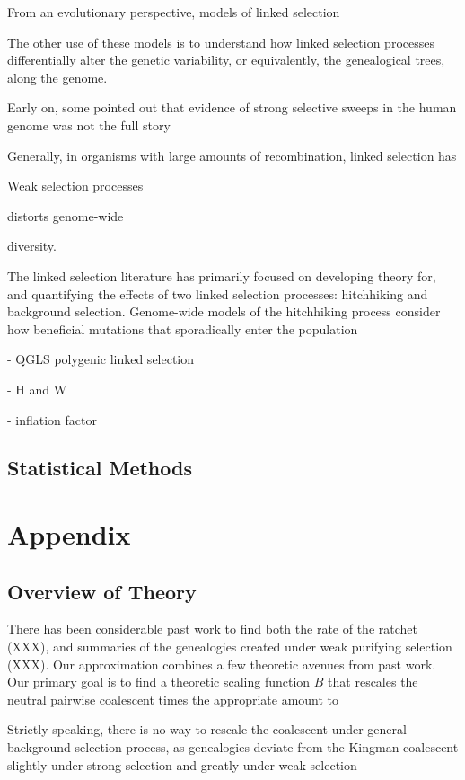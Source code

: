 \documentclass[11pt]{article}
\begin{document}
From an evolutionary perspective, models of linked selection


The other use of these models is to understand how linked selection processes
differentially alter the genetic variability, or equivalently, the genealogical
trees, along the genome. 







Early on, some pointed out that evidence of strong selective sweeps in the
human genome was not the full story 

Generally, in organisms with large amounts of recombination, linked selection
has 


Weak selection processes 

distorts
genome-wide 

diversity.

The linked selection literature has primarily focused on developing theory for,
and quantifying the effects of two linked selection processes: hitchhiking and
background selection. Genome-wide models of the hitchhiking process consider
how beneficial mutations that sporadically enter the population 

- QGLS polygenic linked selection

- H and W

- inflation factor

\subsection*{Statistical Methods}

\section*{Appendix}

\subsection*{Overview of Theory}

There has been considerable past work to find both the rate of the ratchet
(XXX), and summaries of the genealogies created under weak purifying selection
(XXX). Our approximation combines a few theoretic avenues from past work. Our
primary goal is to find a theoretic scaling function $B$ that rescales the neutral
pairwise coalescent times the appropriate amount to 

Strictly speaking, there is no way to rescale the coalescent under general
background selection process, as genealogies deviate from the Kingman
coalescent slightly under strong selection
\parencite{Walczak2012-fi,Cvijovic2018-vd} and greatly under weak selection
\parencite{OFallon2010-my}
\end{document}
